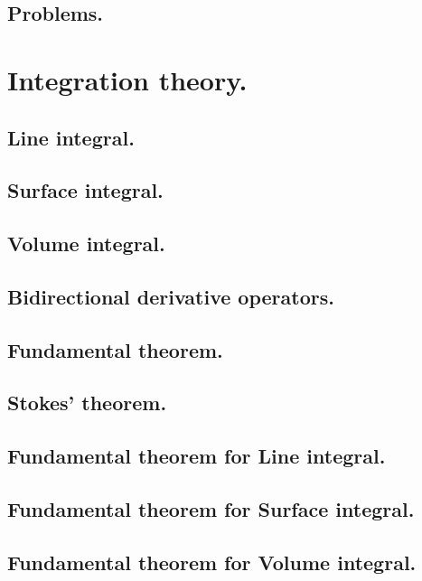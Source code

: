       \subsection{Problems.}
         
         
         
   \section{Integration theory.}
      \subsection{Line integral.}
         
      \subsection{Surface integral.}
         
      \subsection{Volume integral.}
         
      \subsection{Bidirectional derivative operators.}
         
      \subsection{Fundamental theorem.}
         
      \subsection{Stokes' theorem.}
         
      \subsection{Fundamental theorem for Line integral.}
         
      \subsection{Fundamental theorem for Surface integral.}
         
      \subsection{Fundamental theorem for Volume integral.}
         
